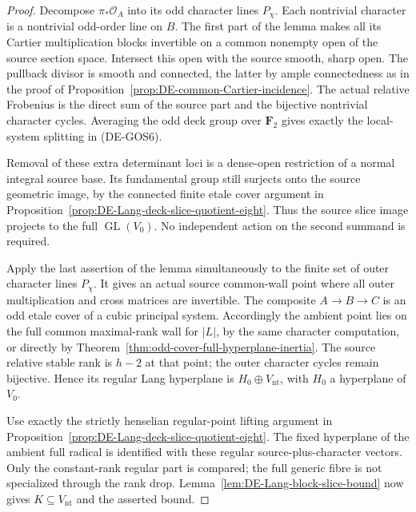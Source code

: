 \begin{proof}
Decompose \(\pi_*\mathcal O_A\) into its odd character lines
\(P_\chi\). Each nontrivial character is a nontrivial odd-order
line on \(B\). The first part of the lemma makes all its Cartier
multiplication blocks invertible on a common nonempty open of the
source section space. Intersect this open with the source smooth,
sharp open. The pullback divisor is smooth and connected, the latter
by ample connectedness as in the proof of
Proposition~\ref{prop:DE-common-Cartier-incidence}. The actual
relative Frobenius is the direct sum of the source part and the
bijective nontrivial character cycles. Averaging the odd deck group
over \(\mathbf F_2\) gives exactly the local-system splitting
in (DE-GOS6).

Removal of these extra determinant loci is a dense-open restriction
of a normal integral source base. Its fundamental group still
surjects onto the source geometric image, by the connected finite
etale cover argument in
Proposition~\ref{prop:DE-Lang-deck-slice-quotient-eight}.
Thus the source slice image projects to the full
\(\operatorname{GL}(V_0)\). No independent action on the second
summand is required.

Apply the last assertion of the lemma simultaneously to the finite
set of outer character lines \(P_\chi\). It gives an actual source
common-wall point where all outer multiplication and cross matrices
are invertible. The composite \(A\to B\to C\) is an odd etale
cover of a cubic principal system. Accordingly the ambient point
lies on the full common maximal-rank wall for \(|L|\), by the
same character computation, or directly by
Theorem~\ref{thm:odd-cover-full-hyperplane-inertia}.
The source relative stable rank is \(h-2\) at that point; the outer
character cycles remain bijective. Hence its regular Lang hyperplane
is \(H_0\oplus V_{\mathrm{nt}}\), with \(H_0\) a hyperplane of
\(V_0\).

Use exactly the strictly henselian regular-point lifting argument
in Proposition~\ref{prop:DE-Lang-deck-slice-quotient-eight}.
The fixed hyperplane of the ambient full radical is identified with
these regular source-plus-character vectors. Only the constant-rank
regular part is compared; the full generic fibre is not specialized
through the rank drop. Lemma~\ref{lem:DE-Lang-block-slice-bound}
now gives \(K\subseteq V_{\mathrm{nt}}\) and the asserted bound.
\end{proof}

